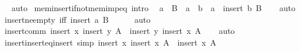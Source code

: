 \begin{isabellebody}
\isadelimproof
\ %
\endisadelimproof
%
\isatagproof
{}\isamarkupfalse%
\ auto%
\endisatagproof
{\isafoldproof}%
%
\isadelimproof
%
\endisadelimproof
\isanewline
\isanewline
\isanewline
{}\isamarkupfalse%
\ mem{\isacharunderscore}{\kern0pt}insert{\isacharunderscore}{\kern0pt}if{\isacharunderscore}{\kern0pt}not{\isacharunderscore}{\kern0pt}mem{\isacharunderscore}{\kern0pt}imp{\isacharunderscore}{\kern0pt}eq\ {\isacharbrackleft}{\kern0pt}intro{\isacharbang}{\kern0pt}{\isacharbrackright}{\kern0pt}{\isacharcolon}{\kern0pt}\isanewline
\ \ {\isachardoublequoteopen}{\isacharparenleft}{\kern0pt}a\ {\isasymnotin}\ B\ {\isasymLongrightarrow}\ a\ {\isacharequal}{\kern0pt}\ b{\isacharparenright}{\kern0pt}\ {\isasymLongrightarrow}\ a\ {\isasymin}\ insert\ b\ B{\isachardoublequoteclose}\isanewline
%
\isadelimproof
\ \ %
\endisadelimproof
%
\isatagproof
{}\isamarkupfalse%
\ auto%
\endisatagproof
{\isafoldproof}%
%
\isadelimproof
\isanewline
%
\endisadelimproof
\isanewline
{}\isamarkupfalse%
\ insert{\isacharunderscore}{\kern0pt}ne{\isacharunderscore}{\kern0pt}empty\ {\isacharbrackleft}{\kern0pt}iff{\isacharbrackright}{\kern0pt}{\isacharcolon}{\kern0pt}\ {\isachardoublequoteopen}insert\ a\ B\ {\isasymnoteq}\ {\isacharbraceleft}{\kern0pt}{\isacharbraceright}{\kern0pt}{\isachardoublequoteclose}\isanewline
%
\isadelimproof
\ \ %
\endisadelimproof
%
\isatagproof
{}\isamarkupfalse%
\ auto%
\endisatagproof
{\isafoldproof}%
%
\isadelimproof
\isanewline
%
\endisadelimproof
\isanewline
{}\isamarkupfalse%
\ insert{\isacharunderscore}{\kern0pt}comm{\isacharcolon}{\kern0pt}\ {\isachardoublequoteopen}insert\ x\ {\isacharparenleft}{\kern0pt}insert\ y\ A{\isacharparenright}{\kern0pt}\ {\isacharequal}{\kern0pt}\ insert\ y\ {\isacharparenleft}{\kern0pt}insert\ x\ A{\isacharparenright}{\kern0pt}{\isachardoublequoteclose}\isanewline
%
\isadelimproof
\ \ %
\endisadelimproof
%
\isatagproof
{}\isamarkupfalse%
\ auto%
\endisatagproof
{\isafoldproof}%
%
\isadelimproof
\isanewline
%
\endisadelimproof
\isanewline
{}\isamarkupfalse%
\ insert{\isacharunderscore}{\kern0pt}insert{\isacharunderscore}{\kern0pt}eq{\isacharunderscore}{\kern0pt}insert\ {\isacharbrackleft}{\kern0pt}simp{\isacharbrackright}{\kern0pt}{\isacharcolon}{\kern0pt}\ {\isachardoublequoteopen}insert\ x\ {\isacharparenleft}{\kern0pt}insert\ x\ A{\isacharparenright}{\kern0pt}\ {\isacharequal}{\kern0pt}\ insert\ x\ A{\isachardoublequoteclose}\isanewline
%
\isadelimproof
\ \ %
\endisadelimproof
%
\isatagproof
{}\isamarkupfalse%

\end{isabellebody}
